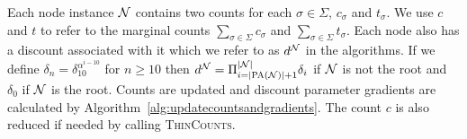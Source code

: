 Each node instance $\N$ contains two counts for each $\sigma \in \Sigma$, $c_\sigma$ and $t_\sigma$.  We use $c$ and $t$ to refer to the marginal counts $\sum_{\sigma \in \Sigma} c_\sigma$ and $\sum_{\sigma \in \Sigma} t_\sigma$.  Each node also has a discount associated with it which we refer to as $d^\N$ in the algorithms. If we define $\delta_{n} = \delta_{10}^{\alpha^{i - 10}}$ for $n \geq 10$ then $d^{\N} = \Pi_{i =|\textsc{PA}(\N)| + 1}^{|\N|} \delta_{i}$ if $\N$ is not the root and $\delta_{0}$ if $\N$ is the root.  Counts are updated and discount parameter gradients are calculated by Algorithm~\ref{alg:updatecountsandgradients}.  The count $c$ is also reduced if needed by calling \textsc{ThinCounts}.




